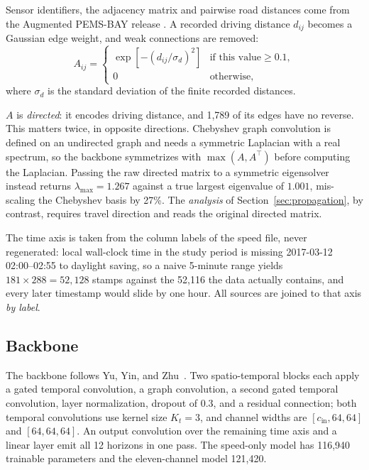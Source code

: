 \documentclass[letterpaper]{article}
\begin{document}
Sensor identifiers, the adjacency matrix and pairwise road distances come from the Augmented PEMS-BAY release \cite{augmentedpemsbay,li2018dcrnn}. A recorded driving distance $d_{ij}$ becomes a Gaussian edge weight, and weak connections are removed:
\begin{equation}
A_{ij}=
\begin{cases}
\exp\!\left[-\left(d_{ij}/\sigma_d\right)^{2}\right] & \text{if this value} \geq 0.1,\\[2pt]
0 & \text{otherwise},
\end{cases}
\end{equation}
where $\sigma_d$ is the standard deviation of the finite recorded distances.

$A$ is \emph{directed}: it encodes driving distance, and 1{,}789 of its edges have no reverse. This matters twice, in opposite directions. Chebyshev graph convolution is defined on an undirected graph and needs a symmetric Laplacian with a real spectrum, so the backbone symmetrizes with $\max(A,A^{\!\top})$ before computing the Laplacian. Passing the raw directed matrix to a symmetric eigensolver instead returns $\lambda_{\max}=1.267$ against a true largest eigenvalue of $1.001$, mis-scaling the Chebyshev basis by 27\%. The \emph{analysis} of Section~\ref{sec:propagation}, by contrast, requires travel direction and reads the original directed matrix.

The time axis is taken from the column labels of the speed file, never regenerated: local wall-clock time in the study period is missing 2017-03-12 02:00--02:55 to daylight saving, so a naive 5-minute range yields $181\times288=52{,}128$ stamps against the 52{,}116 the data actually contains, and every later timestamp would slide by one hour. All sources are joined to that axis \emph{by label}.

\subsection{Backbone}

The backbone follows Yu, Yin, and Zhu~. Two spatio-temporal blocks each apply a gated temporal convolution, a graph convolution, a second gated temporal convolution, layer normalization, dropout of 0.3, and a residual connection; both temporal convolutions use kernel size $K_t=3$, and channel widths are $[c_{\text{in}},64,64]$ and $[64,64,64]$. An output convolution over the remaining time axis and a linear layer emit all 12 horizons in one pass. The speed-only model has 116{,}940 trainable parameters and the eleven-channel model 121{,}420.
\end{document}
